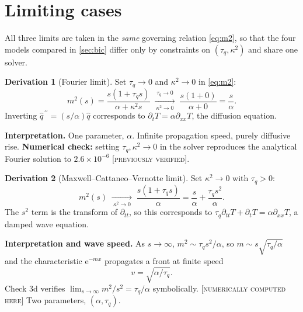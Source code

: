 \documentclass[11pt,a4paper]{article}
\theoremstyle{definition}
\newtheorem{derivationx}{Derivation}[section]
\newcommand{\NUM}{\textcolor{red!55!black}{\footnotesize[\textsc{numerically computed here}]}}
\newcommand{\PREV}{\textcolor{orange!70!black}{\footnotesize[\textsc{previously verified}]}}
\newcommand{\tq}{\tau_{q}}
\newcommand{\kk}{\kappa^{2}}
\newcommand{\Lap}[1]{\hat{#1}}
\begin{document}
\section{Limiting cases}
\label{sec:limits}

All three limits are taken in the \emph{same} governing relation \eqref{eq:m2},
so that the four models compared in \cref{sec:bic} differ only by constraints on
$(\tq,\kk)$ and share one solver.

\begin{derivationx}[Fourier limit]
\label{der:fourier}
Set $\tq\to0$ and $\kk\to0$ in \eqref{eq:m2}:
\begin{equation}
  m^{2}(s)
   = \frac{s(1+\tq s)}{\alpha+\kk s}
   \;\xrightarrow[\ \kk\to0\ ]{\ \tq\to0\ }\;
   \frac{s(1+0)}{\alpha+0}
   = \frac{s}{\alpha} .
  \label{eq:lim-fourier}
\end{equation}
Inverting $\Lap q^{\,\prime\prime}=(s/\alpha)\Lap q$ corresponds to
$\partial_{t}T=\alpha\partial_{xx}T$, the diffusion equation.
\end{derivationx}

\textbf{Interpretation.} One parameter, $\alpha$. Infinite propagation speed,
purely diffusive rise. \textbf{Numerical check:} setting $\tq,\kk\to0$ in the
solver reproduces the analytical Fourier solution to $2.6\times10^{-6}$
\PREV.

\begin{derivationx}[Maxwell--Cattaneo--Vernotte limit]
\label{der:mcv}
Set $\kk\to0$ with $\tq>0$:
\begin{equation}
  m^{2}(s)
   \;\xrightarrow[\ \kk\to0\ ]{}\;
   \frac{s(1+\tq s)}{\alpha}
   = \frac{s}{\alpha} + \frac{\tq s^{2}}{\alpha} .
  \label{eq:lim-mcv}
\end{equation}
The $s^{2}$ term is the transform of $\partial_{tt}$, so this corresponds to
$\tq\partial_{tt}T+\partial_{t}T=\alpha\partial_{xx}T$, a damped wave equation.
\end{derivationx}

\textbf{Interpretation and wave speed.} As $s\to\infty$,
$m^{2}\sim\tq s^{2}/\alpha$, so $m\sim s\sqrt{\tq/\alpha}$ and the
characteristic $\mathrm{e}^{-mx}$ propagates a front at finite speed
\begin{equation}
  v = \sqrt{\alpha/\tq} .
  \label{eq:mcv-speed}
\end{equation}
Check 3d verifies $\lim_{s\to\infty}m^{2}/s^{2}=\tq/\alpha$ symbolically. \NUM
Two parameters, $(\alpha,\tq)$.
\end{document}
